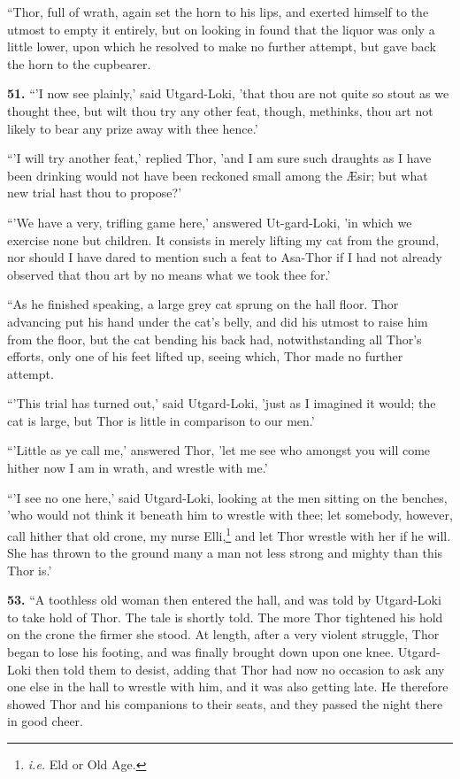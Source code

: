 ``Thor, full of wrath, again set the horn to his lips, and exerted
himself to the utmost to empty it entirely, but on looking in found
that the liquor was only a little lower, upon which he resolved to
make no further attempt, but gave back the horn to the cupbearer.

\textbf{51.} ``'I now see plainly,' said Utgard-Loki, 'that thou are not quite
so stout as we thought thee, but wilt thou try any other feat, though,
methinks, thou art not likely to bear any prize away with thee hence.'

``'I will try another feat,' replied Thor, 'and I am sure such draughts
as I have been drinking would not have been reckoned small among the
Æsir; but what new trial hast thou to propose?'

``'We have a very, trifling game here,' answered Ut-gard-Loki, 'in
which we exercise none but children. It consists in merely lifting my
cat from the ground, nor should I have dared to mention such a feat to
Asa-Thor if I had not already observed that thou art by no means what
we took thee for.'

``As he finished speaking, a large grey cat sprung on the hall floor.
Thor advancing put his hand under the cat's belly, and did his utmost
to raise him from the floor, but the cat bending his back had,
notwithstanding all Thor's efforts, only one of his feet lifted up,
seeing which, Thor made no further attempt.

``'This trial has turned out,' said Utgard-Loki, 'just as I imagined it
would; the cat is large, but Thor is little in comparison to our men.'

``'Little as ye call me,' answered Thor, 'let me see who amongst you
will come hither now I am in wrath, and wrestle with me.'

``'I see no one here,' said Utgard-Loki, looking at the men sitting on
the benches, 'who would not think it beneath him to wrestle with thee;
let somebody, however, call hither that old crone, my nurse Elli,\footnote{\emph{i.e.} Eld or Old Age.}
and let Thor wrestle with her if he will. She has thrown to the
ground many a man not less strong and mighty than this Thor is.'

\textbf{53.} ``A toothless old woman then entered the hall, and was told by
Utgard-Loki to take hold of Thor. The tale is shortly told. The more
Thor tightened his hold on the crone the firmer she stood. At length,
after a very violent struggle, Thor began to lose his footing, and was
finally brought down upon one knee. Utgard-Loki then told them to
desist, adding that Thor had now no occasion to ask any one else in
the hall to wrestle with him, and it was also getting late. He
therefore showed Thor and his companions to their seats, and they
passed the night there in good cheer.

